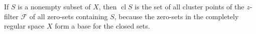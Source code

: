 If $S$ is a nonempty subset of $X$, then $\operatorname{cl} S$ is the set of all cluster points of the $z$-filter $\mathcal{F}$ of all zero-sets containing $S$, because the zero-sets in the completely regular space $X$ form a base for the closed sets.
